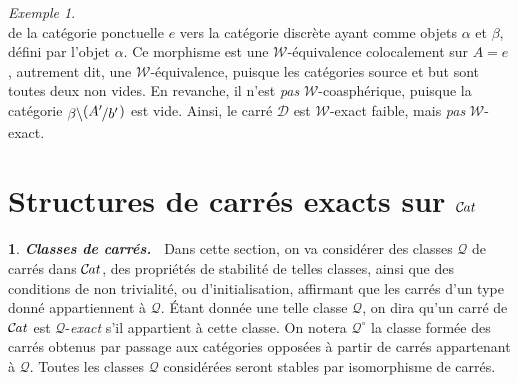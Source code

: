 \documentclass[francais]{smfart}
\theoremstyle{plain}
\theoremstyle{remark}
\newtheorem{ex}[thm]{Exemple}
\theoremstyle{definition}
\newtheorem{paragr}[thm]{}
\numberwithin{equation}{thm}
\begin{document}
\begin{ex}
\[\]
de la catégorie ponctuelle $e$ vers la catégorie discrète ayant comme objets $\alpha$ et $\beta$, défini par l'objet $\alpha$. Ce morphisme est une ${\mathcal{W}}${\nobreakdash}-équivalence colocalement sur $A=e$, autrement dit, une ${\mathcal{W}}${\nobreakdash}-équivalence, puisque les catégories source et but sont toutes deux non vides. En revanche, il n'est \emph{pas} ${\mathcal{W}}${\nobreakdash}-coasphérique, puisque la catégorie ${\mathchoice {\raise -1.8pt\vbox{\hbox{${\beta}\backslash$}}{({\mathchoice {{A'}\raise -1.8pt\vbox{\hbox{$\kern -.8pt/{b'}$}}} {{A'}\raise -1.8pt\vbox{\hbox{$\kern -.8pt/{b'}$}}\kern .8pt} {{A'}\raise -1.8pt\vbox{\hbox{$\scriptstyle\kern -.8pt /{b'}$}}} {{A'}\raise -1.8pt\vbox{\hbox{$\scriptscriptstyle\kern -.8pt /{b'}$}}} })}} {\raise -1.8pt\vbox{\hbox{${\beta}\backslash$}}{({\mathchoice {{A'}\raise -1.8pt\vbox{\hbox{$\kern -.8pt/{b'}$}}} {{A'}\raise -1.8pt\vbox{\hbox{$\kern -.8pt/{b'}$}}\kern .8pt} {{A'}\raise -1.8pt\vbox{\hbox{$\scriptstyle\kern -.8pt /{b'}$}}} {{A'}\raise -1.8pt\vbox{\hbox{$\scriptscriptstyle\kern -.8pt /{b'}$}}} })}} {\raise -1.8pt\vbox{\hbox{$\scriptstyle{\beta}\backslash$}}{({\mathchoice {{A'}\raise -1.8pt\vbox{\hbox{$\kern -.8pt/{b'}$}}} {{A'}\raise -1.8pt\vbox{\hbox{$\kern -.8pt/{b'}$}}\kern .8pt} {{A'}\raise -1.8pt\vbox{\hbox{$\scriptstyle\kern -.8pt /{b'}$}}} {{A'}\raise -1.8pt\vbox{\hbox{$\scriptscriptstyle\kern -.8pt /{b'}$}}} })}} {\raise -1.8pt\vbox{\hbox{$\scriptscriptstyle{\beta}\backslash$}}{({\mathchoice {{A'}\raise -1.8pt\vbox{\hbox{$\kern -.8pt/{b'}$}}} {{A'}\raise -1.8pt\vbox{\hbox{$\kern -.8pt/{b'}$}}\kern .8pt} {{A'}\raise -1.8pt\vbox{\hbox{$\scriptstyle\kern -.8pt /{b'}$}}} {{A'}\raise -1.8pt\vbox{\hbox{$\scriptscriptstyle\kern -.8pt /{b'}$}}} })}} }$ est vide. Ainsi, le carré $\mathcal D$ est ${\mathcal{W}}${\nobreakdash}-exact faible, mais \emph{pas} ${\mathcal{W}}${\nobreakdash}-exact.
\end{ex}

\section{\boldmath Structures de carrés exacts sur ${{\mathcal{C} \mspace{-2.mu} \it{at}}}$}

\begin{paragr} {\emph{\textbf{{Classes de carrés}.\ }}} \label{classcar}
Dans cette section, on va considérer des classes ${\mathcal{Q}}$ de carrés dans ${{\mathcal{C} \mspace{-2.mu} \it{at}}}$, des propriétés de stabilité de telles classes, ainsi que des conditions de non trivialité, ou \og d'initialisation\fg{}, affirmant que les carrés d'un type donné appartiennent à ${\mathcal{Q}}$. \'Etant donnée une telle classe ${\mathcal{Q}}$, on dira qu'un carré de ${{\mathcal{C} \mspace{-2.mu} \it{at}}}$ est ${\mathcal{Q}}${\nobreakdash}-\emph{exact} s'il appartient à cette classe. On notera ${{{\mathcal{Q}}}^{\circ}}$ la classe formée des carrés obtenus par passage aux catégories opposées à partir de carrés appartenant à ${\mathcal{Q}}$. Toutes les classes ${\mathcal{Q}}$ considérées seront stables par isomorphisme de carrés.
\end{paragr}
\end{document}
